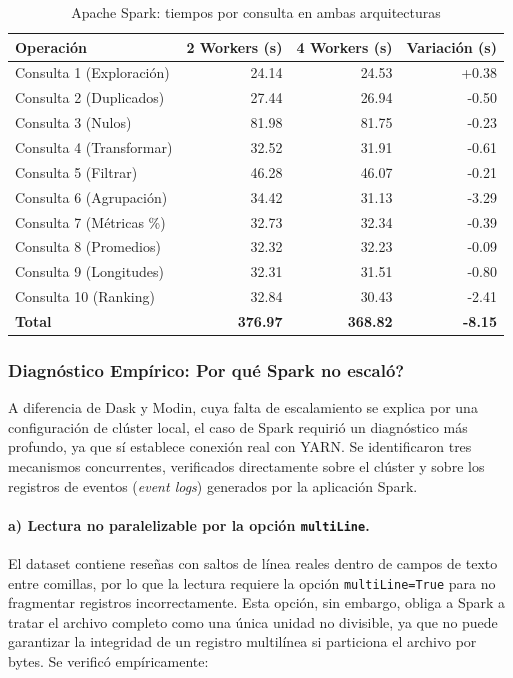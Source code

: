 \begin{table}[H]
\centering
\caption{Apache Spark: tiempos por consulta en ambas arquitecturas}
\label{tab:spark-ab}
\vspace{0.2cm}
\small
\begin{tabular}{lrrr}
\toprule
\textbf{Operación} & \textbf{2 Workers (s)} & \textbf{4 Workers (s)} & \textbf{Variación (s)} \\
\midrule
Consulta 1 (Exploración)     &  24.14 &  24.53 &  +0.38 \\
Consulta 2 (Duplicados)      &  27.44 &  26.94 &  -0.50 \\
Consulta 3 (Nulos)           &  81.98 &  81.75 &  -0.23 \\
Consulta 4 (Transformar)     &  32.52 &  31.91 &  -0.61 \\
Consulta 5 (Filtrar)         &  46.28 &  46.07 &  -0.21 \\
Consulta 6 (Agrupación)      &  34.42 &  31.13 &  -3.29 \\
Consulta 7 (Métricas \%)     &  32.73 &  32.34 &  -0.39 \\
Consulta 8 (Promedios)       &  32.32 &  32.23 &  -0.09 \\
Consulta 9 (Longitudes)      &  32.31 &  31.51 &  -0.80 \\
Consulta 10 (Ranking)        &  32.84 &  30.43 &  -2.41 \\
\midrule
\textbf{Total} & \textbf{376.97} & \textbf{368.82} & \textbf{-8.15} \\
\bottomrule
\end{tabular}
\end{table}

\subsubsection{Diagnóstico Empírico: \textquestiondown{}Por qué Spark no escaló?}
\label{subsec:diagnostico-spark}

A diferencia de Dask y Modin, cuya falta de escalamiento se explica por una configuración de clúster local, el caso de Spark requirió un diagnóstico más profundo, ya que sí establece conexión real con YARN. Se identificaron tres mecanismos concurrentes, verificados directamente sobre el clúster y sobre los registros de eventos (\textit{event logs}) generados por la aplicación Spark.

\paragraph{a) Lectura no paralelizable por la opción \texttt{multiLine}.}
El dataset contiene reseñas con saltos de línea reales dentro de campos de texto entre comillas, por lo que la lectura requiere la opción \texttt{multiLine=True} para no fragmentar registros incorrectamente. Esta opción, sin embargo, obliga a Spark a tratar el archivo completo como una única unidad no divisible, ya que no puede garantizar la integridad de un registro multilínea si particiona el archivo por bytes. Se verificó empíricamente:

